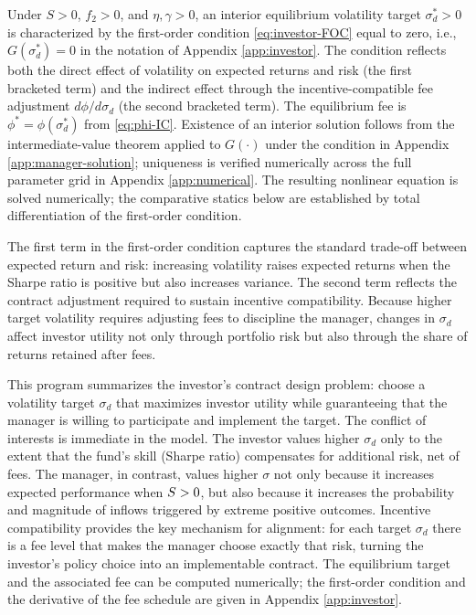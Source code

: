 \begin{remark}
Under $S > 0$, $f_2 > 0$, and $\eta, \gamma > 0$, an interior equilibrium volatility target $\sigma_d^* > 0$ is characterized by the first-order condition \eqref{eq:investor-FOC} equal to zero, i.e., $G(\sigma_d^*)=0$ in the notation of Appendix \ref{app:investor}. The condition reflects both the direct effect of volatility on expected returns and risk (the first bracketed term) and the indirect effect through the incentive-compatible fee adjustment $d\phi/d\sigma_d$ (the second bracketed term). The equilibrium fee is $\phi^* = \phi(\sigma_d^*)$ from \eqref{eq:phi-IC}. Existence of an interior solution follows from the intermediate-value theorem applied to $G(\cdot)$ under the condition in Appendix \ref{app:manager-solution}; uniqueness is verified numerically across the full parameter grid in Appendix \ref{app:numerical}. The resulting nonlinear equation is solved numerically; the comparative statics below are established by total differentiation of the first-order condition.
\end{remark}

The first term in the first-order condition captures the standard
trade-off between expected return and risk: increasing volatility raises
expected returns when the Sharpe ratio is positive but also increases
variance. The second term reflects the contract adjustment required to
sustain incentive compatibility. Because higher target volatility
requires adjusting fees to discipline the manager, changes in
\(\sigma_d\) affect investor utility not only through portfolio risk but
also through the share of returns retained after fees.

This program summarizes the investor's contract design problem: choose a
volatility target \(\sigma_d\) that maximizes investor utility while
guaranteeing that the manager is willing to participate and implement
the target. The conflict of interests is immediate in the model. The
investor values higher \(\sigma_d\) only to the extent that the fund's
skill (Sharpe ratio) compensates for additional risk, net of fees. The
manager, in contrast, values higher \(\sigma\) not only because it
increases expected performance when \(S>0\), but also because it
increases the probability and magnitude of inflows triggered by extreme
positive outcomes. Incentive compatibility provides the key mechanism
for alignment: for each target \(\sigma_d\) there is a fee level that
makes the manager choose exactly that risk, turning the investor's
policy choice into an implementable contract. The equilibrium target and
the associated fee can be computed numerically; the first-order
condition and the derivative of the fee schedule are given in Appendix
\ref{app:investor}.

